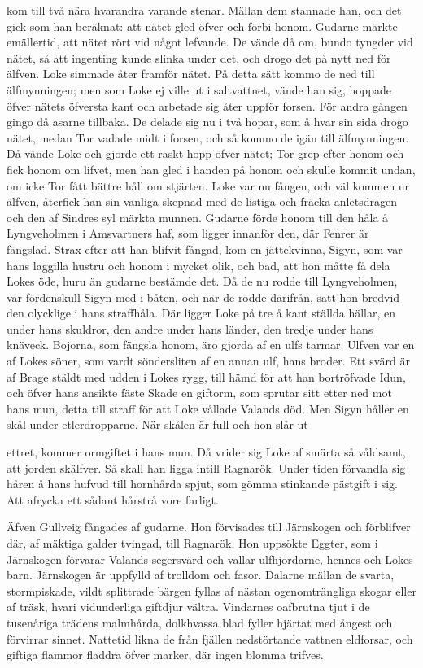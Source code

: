 kom till två nära hvarandra varande stenar. Mällan dem stannade han, och
det gick som han beräknat: att nätet gled öfver och förbi honom. Gudarne
märkte emällertid, att nätet rört vid något lefvande. De vände då om,
bundo tyngder vid nätet, så att ingenting kunde slinka under det, och
drogo det på nytt ned för älfven. Loke simmade åter framför nätet. På
detta sätt kommo de ned till älfmynningen; men som Loke ej ville ut i
saltvattnet, vände han sig, hoppade öfver nätets öfversta kant och
arbetade sig åter uppför forsen. För andra gången gingo då asarne
tillbaka. De delade sig nu i två hopar, som å hvar sin sida drogo nätet,
medan Tor vadade midt i forsen, och så kommo de igän till älfmynningen.
Då vände Loke och gjorde ett raskt hopp öfver nätet; Tor grep efter
honom och fick honom om lifvet, men han gled i handen på honom och
skulle kommit undan, om icke Tor fått bättre håll om stjärten. Loke var
nu fången, och väl kommen ur älfven, återfick han sin vanliga skepnad
med de listiga och fräcka anletsdragen och den af Sindres syl märkta
munnen. Gudarne förde honom till den håla å Lyngveholmen i Amsvartners
haf, som ligger innanför den, där Fenrer är fängslad. Strax efter att
han blifvit fångad, kom en jättekvinna, Sigyn, som var hans laggilla
hustru och honom i mycket olik, och bad, att hon måtte få dela Lokes
öde, huru än gudarne bestämde det. Då de nu rodde till Lyngveholmen, var
fördenskull Sigyn med i båten, och när de rodde därifrån, satt hon
bredvid den olycklige i hans straffhåla. Där ligger Loke på tre å kant
ställda hällar, en under hans skuldror, den andre under hans länder, den
tredje under hans knäveck. Bojorna, som fängsla honom, äro gjorda af en
ulfs tarmar. Ulfven var en af Lokes söner, som vardt söndersliten af en
annan ulf, hans broder. Ett svärd är af Brage stäldt med udden i Lokes
rygg, till hämd för att han bortröfvade Idun, och öfver hans ansikte
fäste Skade en giftorm, som sprutar sitt etter ned mot hans mun, detta
till straff för att Loke vållade Valands död. Men Sigyn håller en skål
under etlerdropparne. När skålen är full och hon slår ut

ettret, kommer ormgiftet i hans mun. Då vrider sig Loke af smärta så
våldsamt, att jorden skälfver. Så skall han ligga intill Ragnarök. Under
tiden förvandla sig håren å hans hufvud till hornhårda spjut, som gömma
stinkande pästgift i sig. Att afrycka ett sådant hårstrå vore farligt.

Äfven Gullveig fångades af gudarne. Hon förvisades till Järnskogen och
förblifver där, af mäktiga galder tvingad, till Ragnarök. Hon uppsökte
Eggter, som i Järnskogen förvarar Valands segersvärd och vallar
ulfhjordarne, hennes och Lokes barn. Järnskogen är uppfylld af trolldom
och fasor. Dalarne mällan de svarta, stormpiskade, vildt splittrade
bärgen fyllas af nästan ogenomträngliga skogar eller af träsk, hvari
vidunderliga giftdjur vältra. Vindarnes oafbrutna tjut i de tusenåriga
trädens malmhårda, dolkhvassa blad fyller hjärtat med ångest och
förvirrar sinnet. Nattetid likna de från fjällen nedstörtande vattnen
eldforsar, och giftiga flammor fladdra öfver marker, där ingen blomma
trifves.

